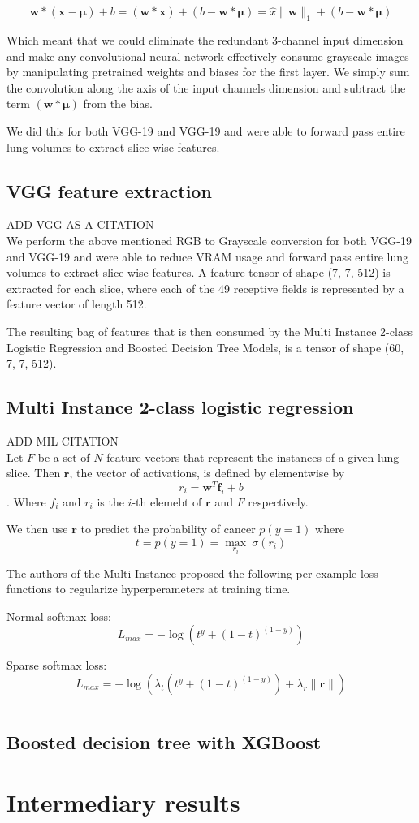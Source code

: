 \documentclass[twocolumn,10pt]{article}
\newcommand{\red}[1]{{\color{red}#1}}
\newcommand{\temp}[1]{{\red{#1}\\}}
\renewcommand{\b}{\boldsymbol}
\begin{document}
$$\b w \ast (\b x - \b \mu) + b = (\b w \ast \b x) + (b - \b w \ast \b \mu)
= \hat x \|\b w\|_1 + (b - \b w \ast \b \mu)$$

Which meant that we could eliminate the redundant 3-channel input dimension and
make any convolutional neural network effectively consume grayscale images by
 manipulating pretrained weights and biases for the first layer. We simply sum
 the convolution along the axis of the input channels dimension and subtract the
 term $(\b w \ast \b \mu)$ from the bias.

 We did this for both VGG-19 and VGG-19 and were able to forward pass entire
 lung volumes to extract slice-wise features.

\subsection{VGG feature extraction}
\temp{ADD VGG AS A CITATION}
We perform the above mentioned RGB to Grayscale conversion for both VGG-19 and VGG-19 
and were able to reduce VRAM usage and forward pass entire lung volumes to 
extract slice-wise features. A feature tensor of shape (7, 7, 512) is extracted
for each slice, where each of the 49 receptive fields is represented by a feature
vector of length 512.

The resulting bag of features that is then consumed by the
Multi Instance 2-class Logistic Regression and Boosted Decision Tree Models,
is a tensor of shape (60, 7, 7, 512).

\subsection{Multi Instance 2-class logistic regression}
\temp{ADD MIL CITATION}
Let $F$ be a set of $N$ feature vectors that represent the instances of a given
lung slice. 
Then $\b r$, the vector of activations, is defined by elementwise by
$$r_i = \b w^T \b f_i + b$$.
Where $f_i$ and $r_i$ is the $i$-th elemebt of $\b r$ and $F$ respectively.

We then use $\b r $ to predict the probability of cancer $p(y = 1)$ where
$$t = p(y = 1) = \max_{r_i} \ \sigma(r_i)$$

The authors of the Multi-Instance proposed the following per example loss functions
to regularize hyperperameters at training time.

Normal softmax loss:
$$L_{max} = -\log(t^y + (1-t) ^{(1-y)})$$

Sparse softmax loss:
$$L_{max} = -\log(\lambda_t(t^y + (1-t) ^{(1-y)}) + \lambda_r\|\b r\|)$$

$$$$
\subsection {Boosted decision tree with XGBoost}

\section{Intermediary results}
\end{document}
